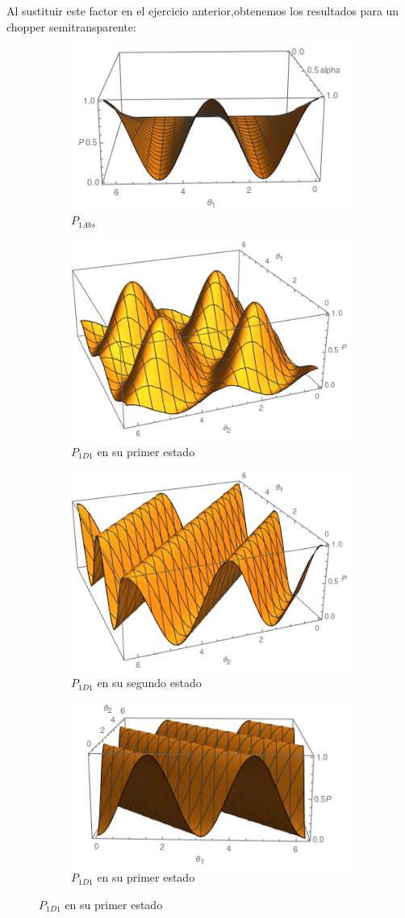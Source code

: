 \documentclass[11pt]{article}
\begin{document}
Al sustituir este factor en el ejercicio anterior,obtenemos los resultados para un chopper semitransparente:
\begin{figure}[h!]
\centering
\begin{subfigure}[b]{0.40\linewidth}
\includegraphics[width=\linewidth,height=3.5 cm]{p1cabs.png}
\caption{$P_{1Abs}$}
\label{fig:BS1}
\end{subfigure}
\begin{subfigure}[b]{0.40\linewidth}
\includegraphics[width=\linewidth,height=3.5 cm]{p1cd21.png}
\caption{$P_{1D1}$ en su primer estado }
\label{fig:BS1}
\end{subfigure}
\begin{subfigure}[b]{0.40\linewidth}
\includegraphics[width=\linewidth,height=3.5 cm]{p1cd22.png}
\caption{$P_{1D1}$ en su segundo estado}
\label{fig:BS1}
\end{subfigure}
\begin{subfigure}[b]{0.40\linewidth}
\includegraphics[width=\linewidth,height=3.5 cm]{p1cd11.png}
\caption{$P_{1D1} $ en su primer estado}

\end{subfigure}
\end{figure}
\end{document}
